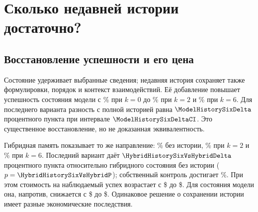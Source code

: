 \section{Сколько недавней истории достаточно?}
\label{sec:capability}
\subsection{Восстановление успешности и его цена}
Состояние удерживает выбранные сведения; недавняя история сохраняет также формулировки, порядок и контекст взаимодействий. Её добавление повышает успешность состояния модели с \ModelStateRate\% при $k=0$ до \ModelHistoryTwoRate\% при $k=2$ и \ModelHistorySixRate\% при $k=6$. Для последнего варианта разность с полной историей равна $\ModelHistorySixDelta$ процентного пункта при интервале $\ModelHistorySixDeltaCI$. Это существенное восстановление, но не доказанная эквивалентность.

\begin{table}[htbp]
\centering\small
\caption{Удержание недавней истории: панель качества. Учитываются все
включённые исходы; у каждого семейства памяти свой контроль полной
истории. Отношение стоимости --- медиана парных отношений, а не отношение
медиан; недоступные гибридные отношения оставлены пустыми. Solved/\$
использует суммарную стоимость с учётом неудач.}
\label{tab:history}
\resizebox{\linewidth}{!}{}
\end{table}

\begin{table}[htbp]
\centering\small
\caption{Панель ресурсов для тех же политик истории. Пиковый промпт
и токены --- медианы по выполнениям; cache hit --- медиана доли кеша
внутри выполнения. Пики и cache hit гибридов недоступны, а не равны нулю.}
\label{tab:history-resources}
\resizebox{\linewidth}{!}{}
\end{table}

Гибридная память показывает то же направление: \HybridRate\% без истории, \HybridHistoryTwoRate\% при $k=2$ и \HybridHistorySixRate\% при $k=6$. Последний вариант даёт $\HybridHistorySixVsHybridDelta$ процентного пункта относительно гибридного состояния без истории ($p=\HybridHistorySixVsHybridP$); собственный контроль достигает \HybridControlRate\%. При этом стоимость на наблюдаемый успех возрастает с \$\HybridCostPerSuccess{} до \$\HybridHistorySixCostPerSuccess{}. Для состояния модели она, напротив, снижается с \$\ModelStateCostPerSuccess{} до \$\ModelHistorySixCostPerSuccess{}. Одинаковое решение о сохранении истории имеет разные экономические последствия.

